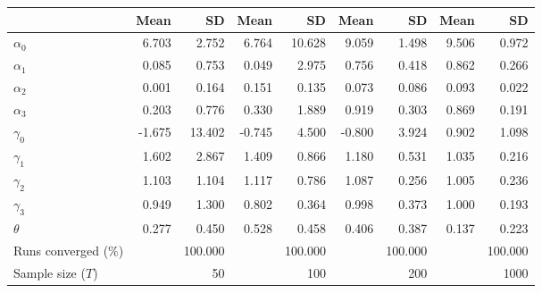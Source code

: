 
\begin{tabular}[t]{lrrrrrrrr}
\toprule
  & Mean & SD & Mean  & SD  & Mean   & SD   & Mean    & SD   \\
\midrule
$\alpha_{0}$ & 6.703 & 2.752 & 6.764 & 10.628 & 9.059 & 1.498 & 9.506 & 0.972\\
$\alpha_{1}$ & 0.085 & 0.753 & 0.049 & 2.975 & 0.756 & 0.418 & 0.862 & 0.266\\
$\alpha_{2}$ & 0.001 & 0.164 & 0.151 & 0.135 & 0.073 & 0.086 & 0.093 & 0.022\\
$\alpha_{3}$ & 0.203 & 0.776 & 0.330 & 1.889 & 0.919 & 0.303 & 0.869 & 0.191\\
$\gamma_{0}$ & -1.675 & 13.402 & -0.745 & 4.500 & -0.800 & 3.924 & 0.902 & 1.098\\
$\gamma_{1}$ & 1.602 & 2.867 & 1.409 & 0.866 & 1.180 & 0.531 & 1.035 & 0.216\\
$\gamma_{2}$ & 1.103 & 1.104 & 1.117 & 0.786 & 1.087 & 0.256 & 1.005 & 0.236\\
$\gamma_{3}$ & 0.949 & 1.300 & 0.802 & 0.364 & 0.998 & 0.373 & 1.000 & 0.193\\
$\theta$ & 0.277 & 0.450 & 0.528 & 0.458 & 0.406 & 0.387 & 0.137 & 0.223\\
Runs converged (\%) &  & 100.000 &  & 100.000 &  & 100.000 &  & 100.000\\
Sample size ($T$) &  & 50 &  & 100 &  & 200 &  & 1000\\
\bottomrule
\end{tabular}
